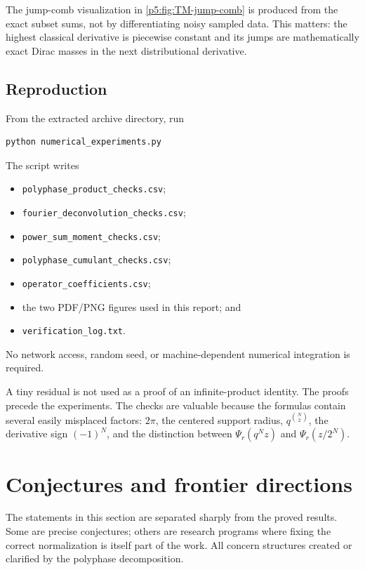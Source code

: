 \documentclass[11pt]{article}
\theoremstyle{definition}
\theoremstyle{remark}
\begin{document}
The jump-comb visualization in \cref{p5:fig:TM-jump-comb} is produced from the
exact subset sums, not by differentiating noisy sampled data.  This matters:
the highest classical derivative is piecewise constant and its jumps are
mathematically exact Dirac masses in the next distributional derivative.

\subsection{Reproduction}

From the extracted archive directory, run
\begin{lstlisting}[style=python]
python numerical_experiments.py
\end{lstlisting}
The script writes
\begin{itemize}
\item \texttt{polyphase\_product\_checks.csv};
\item \texttt{fourier\_deconvolution\_checks.csv};
\item \texttt{power\_sum\_moment\_checks.csv};
\item \texttt{polyphase\_cumulant\_checks.csv};
\item \texttt{operator\_coefficients.csv};
\item the two PDF/PNG figures used in this report; and
\item \texttt{verification\_log.txt}.
\end{itemize}
No network access, random seed, or machine-dependent numerical integration is
required.

\begin{warning}
A tiny residual is not used as a proof of an infinite-product identity.  The
proofs precede the experiments.  The checks are valuable because the formulas
contain several easily misplaced factors: $2\pi$, the centered support radius,
$q^{\binom N2}$, the derivative sign $(-1)^N$, and the distinction between
$\Psi_r(q^Nz)$ and $\Psi_r(z/2^N)$.
\end{warning}

\section{Conjectures and frontier directions}
\label{p5:sec:frontiers}

The statements in this section are separated sharply from the proved results.
Some are precise conjectures; others are research programs where fixing the
correct normalization is itself part of the work.  All concern structures
created or clarified by the polyphase decomposition.
\end{document}
